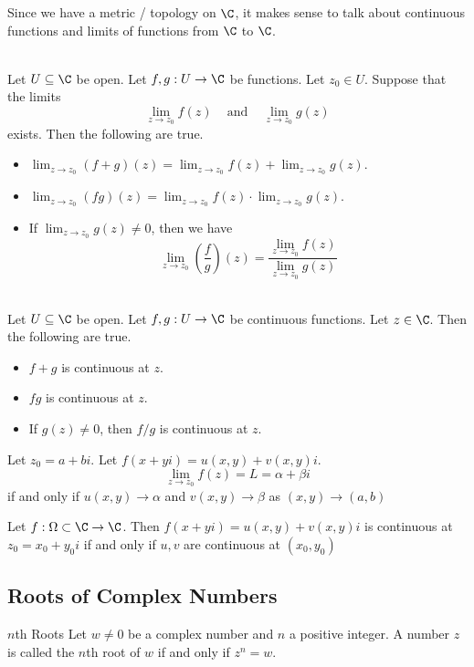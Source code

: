 \documentclass[a4paper]{article}
\begin{document}
Since we have a metric / topology on $\C$, it makes sense to talk about continuous functions and limits of functions from $\C$ to $\C$. 

\begin{prp}{}{}\\
Let $U\subseteq\C$ be open. Let $f,g:U\to\C$ be functions. Let $z_0\in U$. Suppose that the limits $$\lim_{z\to z_0}f(z)\;\;\;\text{ and }\;\;\;\lim_{z\to z_0}g(z)$$ exists. Then the following are true. 
\begin{itemize}
\item $\lim_{z\to z_0}(f+g)(z)=\lim_{z\to z_0}f(z)+\lim_{z\to z_0}g(z)$. 
\item $\lim_{z\to z_0}(fg)(z)=\lim_{z\to z_0}f(z)\cdot\lim_{z\to z_0}g(z)$. 
\item If $\lim_{z\to z_0}g(z)\neq 0$, then we have $$\lim_{z\to z_0}\left(\frac{f}{g}\right)(z)=\frac{\lim_{z\to z_0}f(z)}{\lim_{z\to z_0}g(z)}$$
\end{itemize}
\end{prp}

\begin{prp}{}{}\\
Let $U\subseteq\C$ be open. Let $f,g:U\to\C$ be continuous functions. Let $z\in\C$. Then the following are true. 
\begin{itemize}
\item $f+g$ is continuous at $z$. 
\item $fg$ is continuous at $z$. 
\item If $g(z)\neq 0$, then $f/g$ is continuous at $z$. 
\end{itemize}
\end{prp}

\begin{prp}{}{} Let $z_0=a+bi$. Let $f(x+yi)=u(x,y)+v(x,y)i$. $$\lim_{z\to z_0}f(z)=L=\alpha+\beta i$$ if and only if $u(x,y)\to\alpha$ and $v(x,y)\to\beta$ as $(x,y)\to(a,b)$
\end{prp}

\begin{prp}{}{} Let $f:\Omega\subset\C\to\C$. Then $f(x+yi)=u(x,y)+v(x,y)i$ is continuous at $z_0=x_0+y_0i$ if and only if $u,v$ are continuous at $(x_0,y_0)$
\end{prp}

\subsection{Roots of Complex Numbers}
\begin{defn}{$n$th Roots}{} Let $w\neq0$ be a complex number and $n$ a positive integer. A number $z$ is called the $n$th root of $w$ if and only if $z^n=w$. 
\end{defn}
\end{document}
